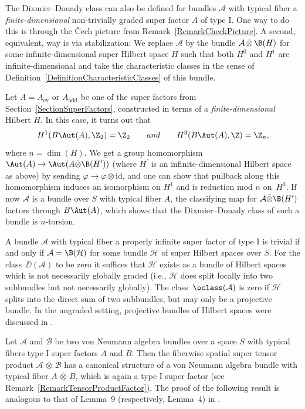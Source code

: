 The Dixmier--Douady class can also be defined for bundles $\mathcal{A}$ with typical fiber a \emph{finite-dimensional} non-trivially graded super factor $A$ of type I.
One way to do this is through the \v{C}ech picture from Remark~\ref{RemarkCheckPicture}.
A second, equivalent, way is via stabilization: We replace $\mathcal{A}$ by the bundle $\mathcal{A} \,\bar{\otimes}\, \B(H)$ for some infinite-dimensional super Hilbert space $H$ such that both $H^0$ and $H^1$ are infinite-dimensional and take the characteristic classes in the sense of Definition~\ref{DefinitionCharacteristicClasses} of this bundle.

\begin{Remark}
Let $A = A_{\mathrm{ev}}$ or $A_{\mathrm{odd}}$ be one of the super factors from Section~\ref{SectionSuperFactors}, constructed in terms of a \emph{finite-dimensional} Hilbert $H$.
In this case, it turns out that
\[H^1(B\Aut(A), \Z_2) = \Z_2\qquad and \qquad H^3(B\Aut(A), \Z) = \Z_n,\]
 where $n = \dim(H)$.
We get a group homomorphism $\Aut(A) \to \Aut(A \bar{\otimes} \B(H^\prime))$ (where $H^\prime$ is an infinite-dimensional Hilbert space as above) by sending $\varphi \to \varphi \otimes \mathrm{id}$, and one can show that pullback along this homomorphism induces an isomorphism on $H^1$ and is reduction mod $n$ on~$H^3$.
If now $\mathcal{A}$ is a bundle over $S$ with typical fiber $A$, the classifying map for $\mathcal{A} \bar{\otimes} \B(H^\prime)$ factors through $B\Aut(A)$, which shows that the Dixmier--Douady class of such a bundle is $n$-torsion.
\end{Remark}

\begin{Remark}
A bundle $\mathcal{A}$ with typical fiber a properly infinite super factor of type I is trivial if and only if $\mathcal{A} = \B(\mathcal{H})$ for some bundle $\mathcal{H}$ of super Hilbert spaces over $S$.
For the class~$\DD(\mathcal{A})$ to be zero it suffices that $\mathcal{H}$ exists as a bundle of Hilbert spaces which is not necessarily globally graded (i.e., $\mathcal{H}$ does split locally into two subbundles but not necessarily globally).
The class~$\oclass(\mathcal{A})$ is zero if $\mathcal{H}$ splits into the direct sum of two subbundles, but may only be a projective bundle.
In the ungraded setting, projective bundles of Hilbert spaces were discussed in \cite{AtiyahSegalTwistedKtheory}.
\end{Remark}

Let $\mathcal{A}$ and $\mathcal{B}$ be two von Neumann algebra bundles over a space $S$ with typical fibers type I super factors $A$ and $B$.
Then the fiberwise spatial super tensor product $\mathcal{A} \,\bar{\otimes}\, \mathcal{B}$ has a canonical structure of a von Neumann algebra bundle with typical fiber $A \,\bar{\otimes}\, B$, which is again a type I super factor (see Remark~\ref{RemarkTensorProductFactor}).
The proof of the following result is analogous to that of Lemma~9 (respectively, Lemma~4) in \cite{DonovanKaroubi}.

